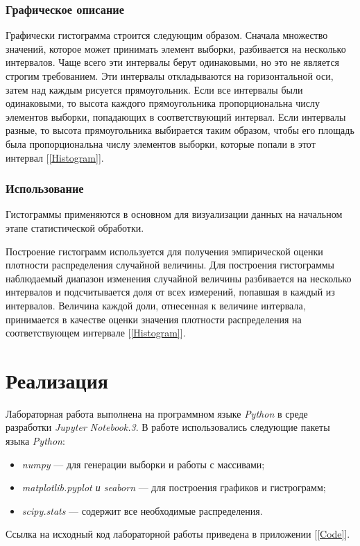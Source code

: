 \documentclass[12pt,a4paper]{article}
\begin{document}
		\subsubsection{Графическое описание}
			Графически гистограмма строится следующим образом. Сначала множество значений, которое может принимать элемент выборки, разбивается на
			несколько интервалов. Чаще всего эти интервалы берут одинаковыми, но
			это не является строгим требованием. Эти интервалы откладываются на
			горизонтальной оси, затем над каждым рисуется прямоугольник. Если все
			интервалы были одинаковыми, то высота каждого прямоугольника пропорциональна числу элементов выборки, попадающих в соответствующий
			интервал. Если интервалы разные, то высота прямоугольника выбирается
			таким образом, чтобы его площадь была пропорциональна числу элементов
			выборки, которые попали в этот интервал [\ref{Histogram}].

		\subsubsection{Использование}
			Гистограммы применяются в основном для визуализации данных на начальном этапе статистической обработки.
			
			Построение гистограмм используется для получения эмпирической оценки плотности распределения случайной величины. Для построения гистограммы наблюдаемый диапазон изменения случайной величины разбивается на несколько интервалов и подсчитывается доля от всех измерений, попавшая в каждый из интервалов. Величина каждой доли, отнесенная к величине интервала, принимается в качестве оценки значения плотности распределения на соответствующем интервале [\ref{Histogram}].

\section{Реализация}
	Лабораторная работа выполнена на программном языке \emph{Python} в среде разработки \emph{Jupyter Notebook.3}. В работе использовались следующие пакеты языка \emph{Python}:
	\begin{itemize}
		\item \emph{numpy} --- для генерации выборки и работы с массивами;
		\item \emph{matplotlib.pyplot  и seaborn} --- для построения графиков и гистрограмм;
		\item \emph{scipy.stats} --- содержит все необходимые распределения.
	\end{itemize}
	Ссылка на исходный код лабораторной работы приведена в приложении [\ref{Code}].
\end{document}
